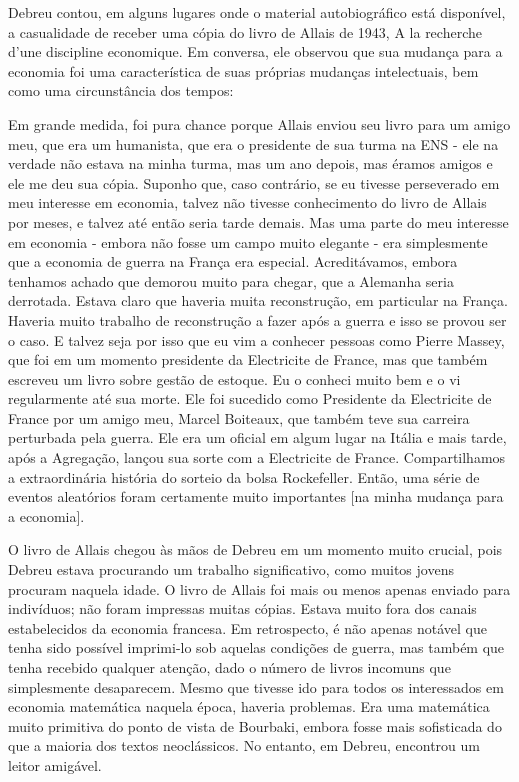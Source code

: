 \documentclass[a4paper,12pt]{article}[abntex2]
\begin{document}
Debreu contou, em alguns lugares onde o material autobiográfico está disponível, a casualidade de receber uma cópia do livro de Allais de 1943, A la recherche d’une discipline economique. Em conversa, ele observou que sua mudança para a economia foi uma característica de suas próprias mudanças intelectuais, bem como uma circunstância dos tempos:

Em grande medida, foi pura chance porque Allais enviou seu livro para um amigo meu, que era um humanista, que era o presidente de sua turma na ENS - ele na verdade não estava na minha turma, mas um ano depois, mas éramos amigos e ele me deu sua cópia. Suponho que, caso contrário, se eu tivesse perseverado em meu interesse em economia, talvez não tivesse conhecimento do livro de Allais por meses, e talvez até então seria tarde demais. Mas uma parte do meu interesse em economia - embora não fosse um campo muito elegante - era simplesmente que a economia de guerra na França era especial. Acreditávamos, embora tenhamos achado que demorou muito para chegar, que a Alemanha seria derrotada. Estava claro que haveria muita reconstrução, em particular na França. Haveria muito trabalho de reconstrução a fazer após a guerra e isso se provou ser o caso. E talvez seja por isso que eu vim a conhecer pessoas como Pierre Massey, que foi em um momento presidente da Electricite de France, mas que também escreveu um livro sobre gestão de estoque. Eu o conheci muito bem e o vi regularmente até sua morte. Ele foi sucedido como Presidente da Electricite de France por um amigo meu, Marcel Boiteaux, que também teve sua carreira perturbada pela guerra. Ele era um oficial em algum lugar na Itália e mais tarde, após a Agregação, lançou sua sorte com a Electricite de France. Compartilhamos a extraordinária história do sorteio da bolsa Rockefeller. Então, uma série de eventos aleatórios foram certamente muito importantes [na minha mudança para a economia].

O livro de Allais chegou às mãos de Debreu em um momento muito crucial, pois Debreu estava procurando um trabalho significativo, como muitos jovens procuram naquela idade. O livro de Allais foi mais ou menos apenas enviado para indivíduos; não foram impressas muitas cópias. Estava muito fora dos canais estabelecidos da economia francesa. Em retrospecto, é não apenas notável que tenha sido possível imprimi-lo sob aquelas condições de guerra, mas também que tenha recebido qualquer atenção, dado o número de livros incomuns que simplesmente desaparecem. Mesmo que tivesse ido para todos os interessados em economia matemática naquela época, haveria problemas. Era uma matemática muito primitiva do ponto de vista de Bourbaki, embora fosse mais sofisticada do que a maioria dos textos neoclássicos. No entanto, em Debreu, encontrou um leitor amigável.
\end{document}
